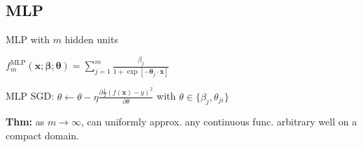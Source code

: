 \subsection*{MLP}

MLP with $m$ hidden units

$f_m^{\text{MLP}}(\mathbf x;\bm \beta;\bm\theta)=\sum_{j=1}^m\frac{\beta_j}{1+\exp[-\bm\theta_j\cdot\mathbf x]}$

MLP SGD: $\theta\leftarrow\theta-\eta\frac{\partial\frac{1}{2}(f(\mathbf x) - y)^2}{\partial\theta}$ with $\theta \in \{\beta_j, \theta_{ji}\}$

\textbf{Thm:} as $m \to \infty$, can uniformly approx. any continuous func. arbitrary well on a compact domain.